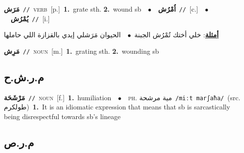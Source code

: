 \documentclass[10pt,a4paper,twoside]{article} %
\begin{document}
\begin{multicols}{2}
{\setlength\topsep{0pt}\textbf{\foreignlanguage{arabic}{مَرَش}}\ {\color{gray}\texttt{//}\color{black}}\ \textsc{verb}\ [p.]\ \textbf{1.}~grate sth.  \textbf{2.}~wound sb\ \ $\bullet$\ \ \setlength\topsep{0pt}\textbf{\foreignlanguage{arabic}{اُمْرُش}}\ {\color{gray}\texttt{//}\color{black}}\ [c.]\ \ $\bullet$\ \ \setlength\topsep{0pt}\textbf{\foreignlanguage{arabic}{يُمْرُش}}\ {\color{gray}\texttt{//}\color{black}}\ [i.]\  \begin{flushright}\color{gray}\foreignlanguage{arabic}{\textbf{\underline{\foreignlanguage{arabic}{أمثلة}}}: خلي أختك تُمْرُش الجبنة\ $\bullet$\ \  الحيوان مَرَشلي إيدي بالقزازة اللي حاملها}\end{flushright}\color{black}} \vspace{2mm}

{\setlength\topsep{0pt}\textbf{\foreignlanguage{arabic}{مَرِش}}\ {\color{gray}\texttt{//}\color{black}}\ \textsc{noun}\ [m.]\ \textbf{1.}~grating sth.  \textbf{2.}~wounding sb\ } \vspace{2mm}

\vspace{-3mm}
\subsection*{\color{blue}\foreignlanguage{arabic}{م.ر.ش.ح}\color{blue}{}} 

{\setlength\topsep{0pt}\textbf{\foreignlanguage{arabic}{مَرْشَحَة}}\ {\color{gray}\texttt{//}\color{black}}\ \textsc{noun}\ [f.]\ \textbf{1.}~humiliation\ \ $\bullet$\ \ \textsc{ph.} \color{gray} \foreignlanguage{arabic}{مية مرشحة}\color{black}\ {\color{gray}\texttt{/{\sffamily miːt marʃaħa}/}\color{black}}\ \color{gray}(src. \foreignlanguage{arabic}{طولكرم})\color{black}\ \textbf{1.}~It is an idiomatic expression that means that sb is sarcastically being disrespectful towards sb's lineage\ } \vspace{2mm}

\vspace{-3mm}
\subsection*{\color{blue}\foreignlanguage{arabic}{م.ر.ص}\color{blue}{}} 


\end{multicols}
\end{document}
